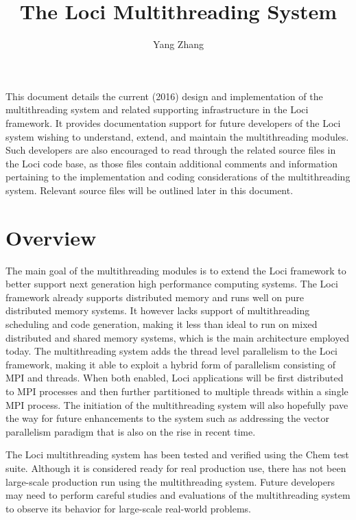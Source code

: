 \documentclass{article}
\begin{document}
\title{The Loci Multithreading System}

\author{Yang Zhang}

\maketitle

This document details the current (2016) design and implementation of
the multithreading system and related supporting infrastructure in the
Loci framework.  It provides documentation support for future developers
of the Loci system wishing to understand, extend, and maintain the
multithreading modules.  Such developers are also encouraged to read
through the related source files in the Loci code base, as those files
contain additional comments and information pertaining to the
implementation and coding considerations of the multithreading system.
Relevant source files will be outlined later in this document.

\section{Overview}
The main goal of the multithreading modules is to extend the Loci
framework to better support next generation high performance computing
systems.  The Loci framework already supports distributed memory and
runs well on pure distributed memory systems.  It however lacks support
of multithreading scheduling and code generation, making it less than
ideal to run on mixed distributed and shared memory systems, which is
the main architecture employed today.  The multithreading system adds
the thread level parallelism to the Loci framework, making it able to
exploit a hybrid form of parallelism consisting of MPI and threads.
When both enabled, Loci applications will be first distributed to MPI
processes and then further partitioned to multiple threads within a
single MPI process.  The initiation of the multithreading system will
also hopefully  pave the way for future enhancements to the system such
as addressing the vector parallelism paradigm that is also on the rise
in recent time.

The Loci multithreading system has been tested and verified using the
Chem test suite.  Although it is considered ready for real production
use, there has not been large-scale production run using the
multithreading system.  Future developers may need to perform careful
studies and evaluations of the multithreading system to observe its
behavior for large-scale real-world problems.
\end{document}
